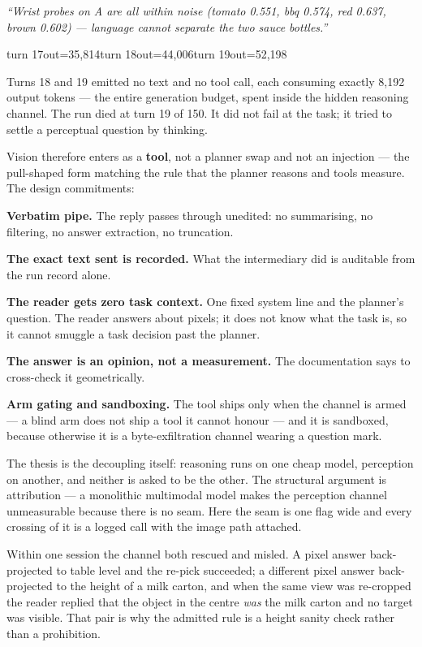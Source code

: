 \documentclass[11pt,a4paper]{report}
\newcommand{\keyrule}[1]{\textbf{\textcolor{acc}{#1}}}
\begin{document}
\begin{evidence}[title={A blind session, turn 16 and then turns 18--19}]
\small\emph{``Wrist probes on A are all within noise (tomato 0.551, bbq 0.574,
red 0.637, brown 0.602) --- language cannot separate the two sauce bottles.''}

\medskip\ttfamily\footnotesize
turn 17\quad out=35{,}814\qquad turn 18\quad out=44{,}006\qquad turn 19\quad out=52{,}198
\end{evidence}

\noindent
Turns 18 and 19 emitted no text and no tool call, each consuming exactly 8{,}192
output tokens --- the entire generation budget, spent inside the hidden reasoning
channel. The run died at turn 19 of 150. It did not fail at the task; it tried
to settle a perceptual question by thinking.

Vision therefore enters as a \textbf{tool}, not a planner swap and not an
injection --- the pull-shaped form matching the rule that the planner reasons and
tools measure. The design commitments:

\keyrule{Verbatim pipe.} The reply passes through unedited: no summarising, no
filtering, no answer extraction, no truncation.

\keyrule{The exact text sent is recorded.} What the intermediary did is auditable
from the run record alone.

\keyrule{The reader gets zero task context.} One fixed system line and the
planner's question. The reader answers about pixels; it does not know what the
task is, so it cannot smuggle a task decision past the planner.

\keyrule{The answer is an opinion, not a measurement.} The documentation says to
cross-check it geometrically.

\keyrule{Arm gating and sandboxing.} The tool ships only when the channel is armed
--- a blind arm does not ship a tool it cannot honour --- and it is sandboxed,
because otherwise it is a byte-exfiltration channel wearing a question mark.

The thesis is the decoupling itself: reasoning runs on one cheap model,
perception on another, and neither is asked to be the other. The structural
argument is attribution --- a monolithic multimodal model makes the perception
channel unmeasurable because there is no seam. Here the seam is one flag wide
and every crossing of it is a logged call with the image path attached.

Within one session the channel both rescued and misled. A pixel answer
back-projected to table level and the re-pick succeeded; a different pixel
answer back-projected to the height of a milk carton, and when the same view was
re-cropped the reader replied that the object in the centre \emph{was} the milk
carton and no target was visible. That pair is why the admitted rule is a height
sanity check rather than a prohibition.
\end{document}

